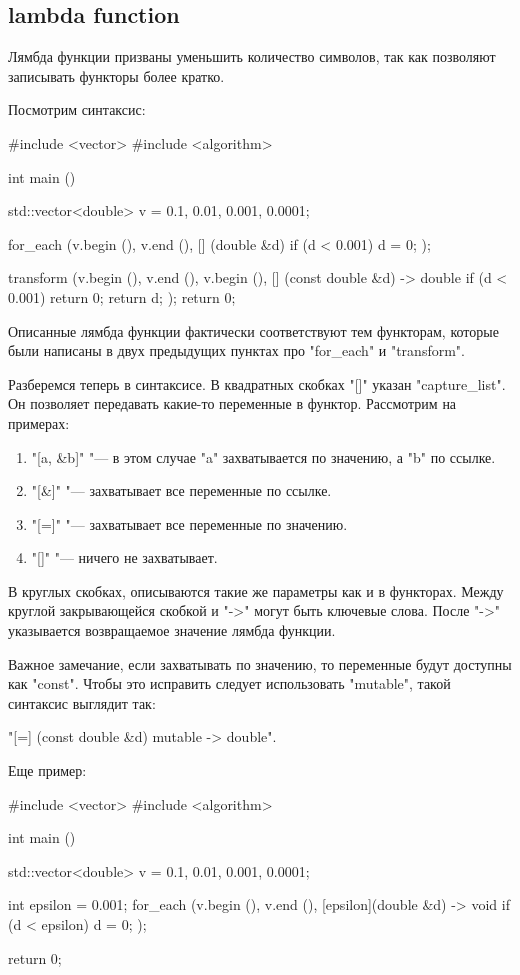 \subsection{lambda function}
Лямбда функции призваны уменьшить количество символов, так как позволяют записывать функторы более кратко. 

Посмотрим синтаксис:

\begin{cppcode}
#include <vector>
#include <algorithm>

int main () {
    std::vector<double> v = {0.1, 0.01, 0.001, 0.0001};

    for_each (v.begin (), v.end (), 
        [] (double &d) {
            if (d < 0.001)
                d = 0;
        }
    );
    
    transform (v.begin (), v.end (), v.begin (), 
        [] (const double &d) -> double {
            if (d < 0.001)
                return 0;
            return d;
        }
    );
    return 0;
}
\end{cppcode}

Описанные лямбда функции фактически соответствуют тем функторам, которые были написаны в двух предыдущих пунктах про \cpp"for_each" и \cpp"transform".

Разберемся теперь в синтаксисе.
В квадратных скобках \cpp"[]" указан \cpp"capture_list". 
Он позволяет передавать какие-то переменные в функтор. 
Рассмотрим на примерах:

\begin{enumerate}
\item \cpp"[a, &b]" "--- в этом случае \cpp"a" захватывается по значению, а \cpp"b" по ссылке.
\item \cpp"[&]" "--- захватывает все переменные по ссылке.
\item \cpp"[=]" "--- захватывает все переменные по значению.
\item \cpp"[]" "--- ничего не захватывает.
\end{enumerate}

В круглых скобках, описываются такие же параметры как и в функторах. 
Между круглой закрывающейся скобкой и \cpp"->" могут быть ключевые слова.
После \cpp"->" указывается возвращаемое значение лямбда функции.

Важное замечание, если захватывать по значению, то переменные будут доступны как \cpp"const".
Чтобы это исправить следует использовать \cpp"mutable", такой синтаксис выглядит так:

\cpp"[=] (const double &d) mutable -> double". 

Еще пример:

\begin{cppcode}
#include <vector>
#include <algorithm>

int main () {
    std::vector<double> v = {0.1, 0.01, 0.001, 0.0001};
    
    int epsilon = 0.001; 
    for_each (v.begin (), v.end (), 
        [epsilon](double &d) -> void {
            if (d < epsilon)
                d = 0;
        }
    );

    return 0;
}
\end{cppcode}




